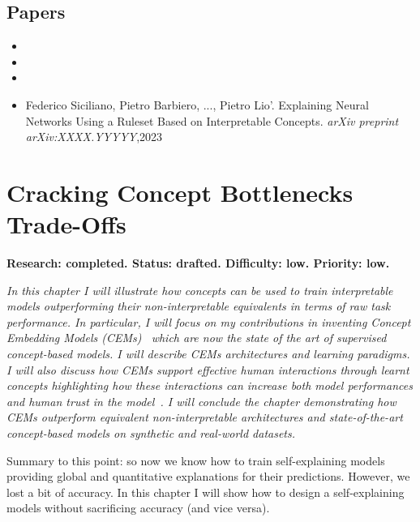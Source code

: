 \documentclass[withindex,glossary]{cam-thesis}
\begin{document}
\section*{Papers}
\nobibliography*
\begin{itemize}
    \item {}
    \item {}
    \item {}
    \item Federico Siciliano, Pietro Barbiero, ..., Pietro Lio'. Explaining Neural Networks Using a Ruleset Based on Interpretable Concepts. \textit{arXiv preprint arXiv:XXXX.YYYYY},2023
\end{itemize}


\chapter{Cracking Concept Bottlenecks Trade-Offs} \label{chapter:cem}
\textbf{Research: completed. Status: drafted. Difficulty: low. Priority: low.}

\textit{In this chapter I will illustrate how concepts can be used to train interpretable models outperforming their non-interpretable equivalents in terms of raw task performance. In particular, I will focus on my contributions in inventing Concept Embedding Models (CEMs)~\citep{zarlenga2022concept} which are now the state of the art of supervised concept-based models. I will describe CEMs architectures and learning paradigms. I will also discuss how CEMs support effective human interactions through learnt concepts highlighting how these interactions can increase both model performances and human trust in the model~\citep{shen2022trust}. I will conclude the chapter demonstrating how CEMs outperform equivalent non-interpretable architectures and state-of-the-art concept-based models on synthetic and real-world datasets.}

Summary to this point: so now we know how to train self-explaining models providing global and quantitative explanations for their predictions. However, we lost a bit of accuracy. In this chapter I will show how to design a self-explaining models without sacrificing accuracy (and vice versa).
\end{document}
